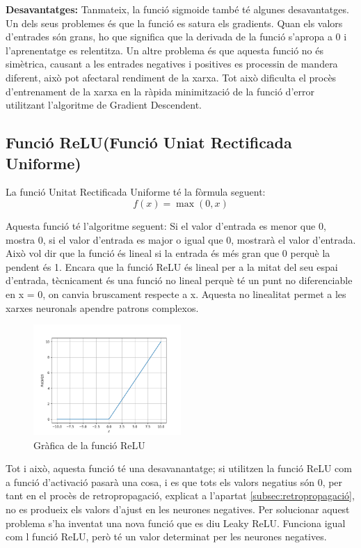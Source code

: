 \textbf{Desavantatges:}
Tanmateix, la funció sigmoide també té algunes desavantatges. Un dels seus problemes és que la funció es satura els gradients. Quan els valors d'entrades són grans, ho que significa que la derivada de la funció s'apropa a 0 i l'aprenentatge es relentitza. Un altre problema és que aquesta funció no és simètrica, causant a les entrades negatives i positives es processin de mandera diferent, això pot afectaral rendiment de la xarxa. Tot això dificulta el procès d'entrenament de la xarxa en la ràpida minimització de la funció d'error utilitzant l'algoritme de Gradient Descendent.
\subsection{Funció ReLU(Funció Uniat Rectificada Uniforme)}\label{subsec:1}
La funció Unitat Rectificada Uniforme té la fòrmula seguent:
\[ f(x) = \max(0, x) \]

Aquesta funció té l'algoritme seguent: Si el valor d'entrada es menor que 0, mostra 0, si el valor d'entrada es major o igual que 0, mostrarà el valor d'entrada. Això vol dir que la funció és lineal si la entrada és més gran que 0 perquè la pendent és 1. Encara que la funció ReLU és lineal per a la mitat del seu espai d'entrada, tècnicament és una funció no lineal perquè té un punt no diferenciable en x = 0, on canvia bruscament respecte a x. Aquesta no linealitat permet a les xarxes neuronals apendre patrons complexos.

\begin{figure}[h!]
    \centering
    \includegraphics[width=0.5\textwidth]{./figures/ReLU.png}
    \caption{Gràfica de la funció ReLU}
\end{figure}

Tot i això, aquesta funció té una desavanantatge; si utilitzen la funció ReLU com a funció d'activació pasarà una cosa, i es que tots els valors negatius són 0, per tant en el procès de retropropagació, explicat a l'apartat \ref{subsec:retropropagació}, no es produeix els valors d'ajust en les neurones negatives. Per solucionar aquest problema s'ha inventat una nova funció que es diu Leaky ReLU. Funciona igual com l funció ReLU, però té un valor determinat per les neurones negatives.

